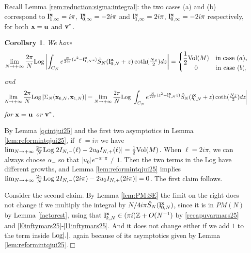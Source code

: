 \documentclass[11pt]{amsart}
\newtheorem{cor}[teo]{Corollary}
\newcommand{\cvd}{\hfill$\Box$}
\newcommand{\mz}{\mathbb{Z}}
\newcommand{\bu}{{\bf u}}
\newcommand{\bx}{{\bf x}}
\newcommand{\bv}{{\bf v}}
\newcommand{\bl}{{\bf l}}
\newcommand{\Log}{{\rm Log}}
\def\cvd{\hfill$\Box$}
\begin{document}
Recall Lemma \ref{rem:reduction:sigma:integral}: the two cases (a) and (b) correspond to $\bl_{1,\infty}^\bx=i\pi$, $\bl_{0,\infty}^\bx=-2i\pi$ and $\bl_{1,\infty}^\bx=2i\pi$, $\bl_{0,\infty}^\bx=-2i\pi$ respectively, for both $\bx=\bu$ and $\bv^*$.
\begin{cor}\label{cor:reductionintjui25} We have
$$\lim_{N\rightarrow +\infty}\dfrac{2\pi}{N}\Log \left \vert \int_{C_N} e^{\frac{N}{2i\pi}(z^2 - \bl_{1,N}^\bx z)}\hat S_N(\bl_{0,N}^\bx + z)\textstyle \coth(\frac{Nz}{2})dz \right \vert  = \left \{\begin{matrix}
\dfrac{1}{2}{\rm Vol}(M) & \text{in\ case} \ (a),\\
0  & \text{in\ case}\  (b),
\end{matrix}
\right.$$
and 
$$\lim_{N\rightarrow +\infty}\dfrac{2\pi}{N}\Log \left \vert \Sigma_N(\bx_{0,N},\bx_{1,N})\right \vert = \lim_{N\rightarrow +\infty}\dfrac{2\pi}{N}\Log \left \vert \int_{C_N} e^{\frac{N}{2i\pi}(z^2 - \bl_{1,N}^\bx z)}\hat S_N(\bl_{0,N}^\bx + z)\textstyle \coth(\frac{Nz}{2})dz \right \vert$$
for $\bx =\bu$ or $\bv^*$.
\end{cor}
\proof By Lemma \ref{qcintjui25} and the first two asymptotics in Lemma \ref{lem:reformintqjui25}, if $\ell = i\pi$ we have $\textstyle \lim_{N\to +\infty}\textstyle \frac{2\pi}{N}\Log  \vert 2I_{N,-}(\ell) -2u_0  I_{N,+}(\ell)\vert = \textstyle \frac{1}{2}{\rm Vol}(M)$. When $\ell = 2i\pi$, we can always choose $\alpha_-$ so that $\vert u_0\vert e^{-\alpha^-\pi} \ne 1$. Then the two terms in the Log have different growths, and Lemma \ref{lem:reformintqjui25} implies $\textstyle \lim_{N\to +\infty}\textstyle \frac{2\pi}{N}\Log  \vert 2I_{N,-}(2i\pi) -2u_0  I_{N,+}(2i\pi)\vert=0$. The first claim follows.

Consider the second claim. By Lemma \ref{lem:PM:SE} the limit on the right does not change if we multiply the integral by $N/4i\pi \hat S_N(\bl_{0,N}^\bx)$, since it is in $PM(N)$ by Lemma \ref{factorest}, using that ${\bf l}_{k,N}^\bx \in (\pi i) \mz + O(N^{-1})$ by \eqref{recapuvarmars25} and \eqref{l0inftymars25}-\eqref{l1inftymars25}. And it does not change either if we add $1$ to the term inside $\Log|.|$, again because of its asymptotics given by Lemma \ref{lem:reformintqjui25}.\cvd
\end{document}
